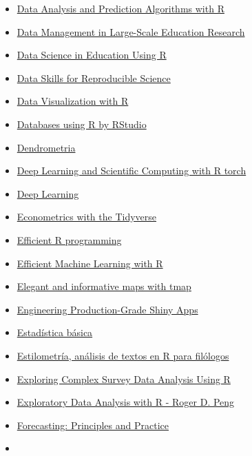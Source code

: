 \documentclass[
]{article}
\begin{document}
\begin{itemize}
{  Plumber}
\item
  \href{http://rafalab.dfci.harvard.edu/dsbook/}{Data Analysis and
  Prediction Algorithms with R}
\item
  \href{https://datamgmtinedresearch.com/}{Data Management in
  Large-Scale Education Research}
\item
  \href{https://datascienceineducation.com/}{Data Science in Education
  Using R}
\item
  \href{https://psyteachr.github.io/msc-data-skills/}{Data Skills for
  Reproducible Science}
\item
  \href{https://rkabacoff.github.io/datavis/}{Data Visualization with R}
\item
  \href{https://db.rstudio.com/getting-started/}{Databases using R by
  RStudio}
\item
  \href{https://gitlab.com/Puletti/dendrometria_libro}{Dendrometria}
\item
  \href{https://skeydan.github.io/Deep-Learning-and-Scientific-Computing-with-R-torch/}{Deep
  Learning and Scientific Computing with R torch}
\item
  \href{https://srdas.github.io/DLBook/}{Deep Learning}
\item
  \href{https://colleen.quarto.pub/the-tidy-econometrics-workbook/}{Econometrics
  with the Tidyverse}
\item
  \href{https://csgillespie.github.io/efficientR/}{Efficient R
  programming}
\item
  \href{https://emlwr.org/}{Efficient Machine Learning with R}
\item
  \href{https://r-tmap.github.io/tmap-book/}{Elegant and informative
  maps with tmap}
\item
  \href{https://engineering-shiny.org/}{Engineering Production-Grade
  Shiny Apps}
\item
  \href{https://www.uv.es/ayala/docencia/nmr/nmr13.pdf}{Estadística
  básica}
\item
  \href{http://www.aic.uva.es/cuentapalabras/presentacion.html}{Estilometría,
  análisis de textos en R para filólogos}
\item
  \href{https://tidy-survey-r.github.io/tidy-survey-book/}{Exploring
  Complex Survey Data Analysis Using R}
\item
  \href{https://bookdown.org/rdpeng/exdata/}{Exploratory Data Analysis
  with R - Roger D. Peng}
\item
  \href{https://otexts.com/fpp3/}{Forecasting: Principles and Practice}
\item

\end{itemize}
\end{document}
